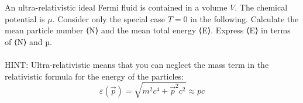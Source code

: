 An ultra-relativistic ideal Fermi fluid is contained in a 
volume $V$. The chemical potential is $\mu$. Consider only 
the special case $T=0$ in the following. Calculate the mean 
particle number ⟨N⟩ and the mean total energy ⟨E⟩. 
Express ⟨E⟩ in terms of ⟨N⟩ and µ. \\
\\
HINT: Ultra-relativistic means that you can neglect the mass 
term in the relativistic formula for the energy of the 
particles:
\begin{equation}
    \varepsilon(\vec p)=\sqrt{m^2c^4+\vec p^2c^2}\approx pc
\end{equation}

